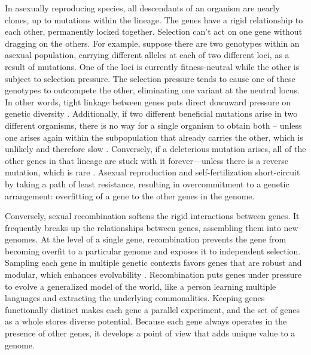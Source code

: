 \documentclass[12pt]{article}
\begin{document}
In asexually reproducing species, all descendants of an organism are nearly clones, up to mutations within the lineage. The genes have a rigid relationship to each other, permanently locked together. Selection can't act on one gene without dragging on the others. For example, suppose there are two genotypes within an asexual population, carrying different alleles at each of two different loci, as a result of mutations. One of the loci is currently fitness-neutral while the other is subject to selection pressure. The selection pressure tends to cause one of these genotypes to outcompete the other, eliminating one variant at the neutral locus. In other words, tight linkage between genes puts direct downward pressure on genetic diversity \citep{charlesworth1993effect, hudson1995deleterious}. Additionally, if two different beneficial mutations arise in two different organisms, there is no way for a single organism to obtain both -- unless one arises again within the subpopulation that already carries the other, which is unlikely and therefore slow \citep{hill1966effect, felsenstein1974evolutionary, weismann1889essays, fisher1930genetial, muller1932some, crow1965evolution}. Conversely, if a deleterious mutation arises, all of the other genes in that lineage are stuck with it forever---unless there is a reverse mutation, which is rare \citep{keightley2006interference, muller1932some}. Asexual reproduction and self-fertilization short-circuit by taking a path of least resistance, resulting in overcommitment to a genetic arrangement: overfitting of a gene to the other genes in the genome.

Conversely, sexual recombination softens the rigid interactions between genes. It frequently breaks up the relationships between genes, assembling them into new genomes. At the level of a single gene, recombination prevents the gene from becoming overfit to a particular genome and exposes it to independent selection. Sampling each gene in multiple genetic contexts favors genes that are robust and modular, which enhances evolvability \citep{livnat2008mixability, livnat2010sex, wagner1996perspective, holland1975adaptation,dawkins1976selfish, clune2013evolutionary, pigliucci2008evolvability, misevic2006sexual}. Recombination puts genes under pressure to evolve a generalized model of the world, like a person learning multiple languages and extracting the underlying commonalities. Keeping genes functionally distinct makes each gene a parallel experiment, and the set of genes as a whole stores diverse potential. Because each gene always operates in the presence of other genes, it develops a point of view that adds unique value to a genome.
\end{document}
